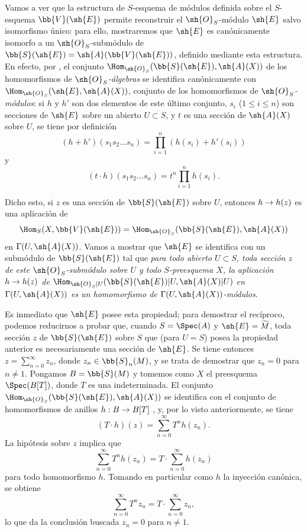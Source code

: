 \documentclass[oneside,10pt]{amsart}
\makeatletter
\renewcommand{\leq}{\leqslant}
\newcommand{\ega@arrow}[2]{\mathchoice{#1}{#2}{#2}{#2}}
\renewcommand{\to}{\ega@arrow{\longrightarrow}{\rightarrow}}
\newcommand{\oldpage}[2][]{\marginnote{\normalfont\footnotesize\textbf{#1}~|~#2}\ignorespaces}
\let\EGAOriginalLabel\label
\renewcommand{\label}[1]{\phantomsection\EGAOriginalLabel{#1}}
\makeatother
\begin{document}
\begin{env}[1.7.14]
\label{II.1.7.14}
Vamos a ver que la estructura de $S$-esquema de módulos definida sobre el $S$-esquema $\bb{V}(\sh{E})$ permite reconstruir el $\sh{O}_S$-módulo $\sh{E}$ salvo isomorfismo único: para ello, mostraremos que $\sh{E}$ es canónicamente isomorfo a un $\sh{O}_S$-submódulo de $\bb{S}(\sh{E})=\sh{A}(\bb{V}(\sh{E}))$, definido mediante esta estructura.
En efecto, por , el conjunto $\Hom_{\sh{O}_S}(\bb{S}(\sh{E}),\sh{A}(X))$ de los homomorfismos de \emph{$\sh{O}_S$-álgebras} se identifica canónicamente con $\Hom_{\sh{O}_S}(\sh{E},\sh{A}(X))$, conjunto de los homomorfismos de \emph{$\sh{O}_S$-módulos}: si $h$ y $h'$ son dos elementos de este último conjunto, $s_i$ ($1\leq i\leq n$) son secciones de $\sh{E}$ sobre un abierto $U\subset S$, y $t$ es una sección de $\sh{A}(X)$ sobre $U$, se tiene por definición
\[
  (h+h')(s_1s_2\ldots s_n)
  =\prod_{i=1}^n(h(s_i)+h'(s_i))
\]
y
\[
  (t\cdot h)(s_1s_2\ldots s_n)
  =t^n\prod_{i=1}^n h(s_i).
\]

Dicho esto, si $z$ es una sección de $\bb{S}(\sh{E})$ sobre $U$, entonces $h\to h(z)$ es una aplicación de
\[
  \Hom_S(X,\bb{V}(\sh{E}))
  =\Hom_{\sh{O}_S}(\bb{S}(\sh{E}),\sh{A}(X))
\]
en $\Gamma(U,\sh{A}(X))$.
Vamos a
\oldpage[II]{19}
mostrar que $\sh{E}$ se identifica con un submódulo de $\bb{S}(\sh{E})$ tal que \emph{para todo abierto $U\subset S$, toda sección $z$ de este $\sh{O}_S$-submódulo sobre $U$ y todo $S$-preesquema $X$, la aplicación $h\to h(z)$ de $\Hom_{\sh{O}_S|U}(\bb{S}(\sh{E})|U,\sh{A}(X)|U)$ en $\Gamma(U,\sh{A}(X))$ es un homomorfismo de $\Gamma(U,\sh{A}(X))$-módulos}.

Es inmediato que $\sh{E}$ posee esta propiedad; para demostrar el recíproco, podemos reducirnos a probar que, cuando $S=\Spec(A)$ y $\sh{E}=\widetilde{M}$, toda sección $z$ de $\bb{S}(\sh{E})$ sobre $S$ que (para $U=S$) posea la propiedad anterior es necesariamente una sección de $\sh{E}$.
Se tiene entonces $z=\sum_{n=0}^{\infty}z_n$, donde $z_n\in\bb{S}_n(M)$, y se trata de demostrar que $z_n=0$ para $n\neq1$.
Pongamos $B=\bb{S}(M)$ y tomemos como $X$ el preesquema $\Spec(B[T])$, donde $T$ es una indeterminada.
El conjunto $\Hom_{\sh{O}_S}(\bb{S}(\sh{E}),\sh{A}(X))$ se identifica con el conjunto de homomorfismos de anillos $h:B\to B[T]$ , y, por lo visto anteriormente, se tiene
\[
  (T\cdot h)(z)=\sum_{n=0}^{\infty}T^n h(z_n).
\]
La hipótesis sobre $z$ implica que
\[
  \sum_{n=0}^{\infty}T^n h(z_n)
  =T\cdot\sum_{n=0}^{\infty}h(z_n)
\]
para todo homomorfismo $h$.
Tomando en particular como $h$ la inyección canónica, se obtiene
\[
  \sum_{n=0}^{\infty}T^n z_n
  =T\cdot\sum_{n=0}^{\infty}z_n,
\]
lo que da la conclusión buscada $z_n=0$ para $n\neq1$.
\end{env}
\end{document}
